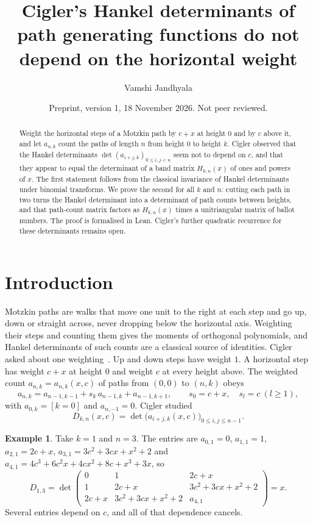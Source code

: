 \documentclass[11pt]{amsart}
\title[Hankel determinants of path generating functions]{Cigler's Hankel determinants of path generating functions do not depend on the horizontal weight}
\author{Vamshi Jandhyala}
\date{Preprint, version 1, 18 November 2026. Not peer reviewed.}
\theoremstyle{definition}
\newtheorem{example}{Example}
\begin{document}
\begin{abstract}
Weight the horizontal steps of a Motzkin path by $c+x$ at height $0$ and by $c$ above it, and let $a_{n,k}$ count the
paths of length $n$ from height $0$ to height $k$. Cigler observed that the Hankel determinants
$\det(a_{i+j,k})_{0\le i,j<n}$ seem not to depend on $c$, and that they appear to equal the determinant of a
band matrix $H_{k,n}(x)$ of ones and powers of $x$. The first statement follows from the classical invariance of Hankel
determinants under binomial transforms. We prove the second for all $k$ and $n$: cutting each path in two turns the
Hankel determinant into a determinant of path counts between heights, and that path-count matrix factors as $H_{k,n}(x)$
times a unitriangular matrix of ballot numbers.
The proof is formalised in Lean. Cigler's further quadratic recurrence for these determinants remains open.
\end{abstract}

\maketitle

\section{Introduction}

Motzkin paths are walks that move one unit to the right at each step and go up, down or straight across, never
dropping below the horizontal axis. Weighting their steps and counting them gives the moments of orthogonal
polynomials, and Hankel determinants of such counts are a classical source of identities. Cigler asked about one
weighting~\cite{MO,C23}. Up and down steps have weight $1$. A horizontal step has weight $c+x$ at height $0$
and weight $c$ at every height above. The weighted count $a_{n,k}=a_{n,k}(x,c)$ of paths from $(0,0)$ to $(n,k)$ obeys
\[
a_{n,k}=a_{n-1,k-1}+s_k\,a_{n-1,k}+a_{n-1,k+1},\qquad s_0=c+x,\quad s_l=c\ (l\ge1),
\]
with $a_{0,k}=[k=0]$ and $a_{n,-1}=0$. Cigler studied
\[
D_{k,n}(x,c)=\det\big(a_{i+j,k}(x,c)\big)_{0\le i,j\le n-1}.
\]

\begin{example}\label{ex:small}
Take $k=1$ and $n=3$. The entries are $a_{0,1}=0$, $a_{1,1}=1$, $a_{2,1}=2c+x$, $a_{3,1}=3c^2+3cx+x^2+2$ and
$a_{4,1}=4c^3+6c^2x+4cx^2+8c+x^3+3x$, so
\[
D_{1,3}=\det\begin{pmatrix}0&1&2c+x\\ 1&2c+x&3c^2+3cx+x^2+2\\ 2c+x&3c^2+3cx+x^2+2&a_{4,1}\end{pmatrix}=x.
\]
Several entries depend on $c$, and all of that dependence cancels.
\end{example}
\end{document}
